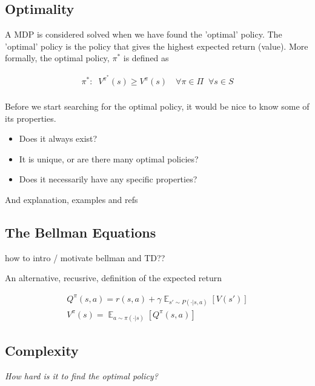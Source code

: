 \subsection{Optimality}

A MDP is considered solved when we have found the 'optimal' policy. The 'optimal'
policy is the policy that gives the highest
expected return (value). More formally, the optimal policy, $\pi^{* }$ is defined as

\begin{align*}
\pi^{*} : \;\; V^{\pi^* }(s) \ge V^{\pi}(s) \quad \forall \pi\in \Pi \;\;\forall s\in S\\
\end{align*}

Before we start searching for the optimal policy, it would be nice to know some of its properties.

\begin{itemize}
\tightlist
  \item Does it always exist?
  \item It is unique, or are there many optimal policies?
  \item Does it necessarily have any specific properties?
\end{itemize}

{\color{red} And explanation, examples and refs}

\subsection{The Bellman Equations}

{\color{red}how to intro / motivate bellman and TD??}

An alternative, recusrive, definition of the expected return


\begin{align*}
Q^{\pi}(s, a) = r(s, a) + \gamma \mathop{\mathbb E}_{s' \sim P(\cdot|s, a)} [V(s')] \label{eq:bellman-eqn}\tag{Bellman equation}\\
V^{\pi}(s) = \mathop{\mathbb E}_{a \sim \pi(\cdot|s)} [Q^{\pi}(s, a)]
\end{align*}


\subsection{Complexity}

\begin{displayquote}
  \textit{How hard is it to find the optimal policy?}
\end{displayquote}

